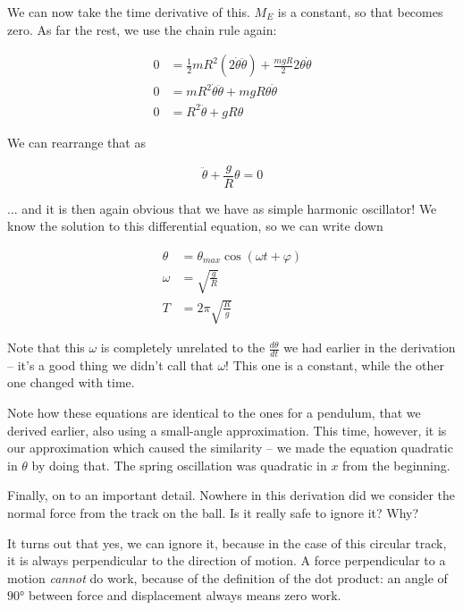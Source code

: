 \documentclass[8.01x]{subfiles}
\begin{document}
We can now take the time derivative of this. $M_E$ is a constant, so that becomes zero. As far the rest, we use the chain rule again:

\begin{align}
0 &= \frac{1}{2} m R^2 (2 \dot{\theta} \ddot{\theta}) + \frac{m g R}{2} 2 \theta \dot{\theta}\\
0 &= m R^2 \dot{\theta} \ddot{\theta} + m g R \theta \dot{\theta}\\
0 &= R^2 \ddot{\theta} + g R \theta
\end{align}

We can rearrange that as

\begin{equation}
\ddot{\theta} + \frac{g}{R} \theta = 0
\end{equation}

... and it is then again obvious that we have as simple harmonic oscillator! We know the solution to this differential equation, so we can write down

\begin{align}
\theta &= \theta_{max} \cos (\omega t + \varphi)\\
\omega &= \sqrt{\frac{g}{R}}\\
T      &= 2 \pi \sqrt{\frac{R}{g}}
\end{align}

Note that this $\omega$ is completely unrelated to the $\displaystyle \frac{d\theta}{dt}$ we had earlier in the derivation -- it's a good thing we didn't call that $\omega$! This one is a constant, while the other one changed with time.

Note how these equations are identical to the ones for a pendulum, that we derived earlier, also using a small-angle approximation. This time, however, it is our approximation which caused the similarity -- we made the equation quadratic in $\theta$ by doing that. The spring oscillation was quadratic in $x$ from the beginning.

Finally, on to an important detail. Nowhere in this derivation did we consider the normal force from the track on the ball. Is it really safe to ignore it? Why?

It turns out that yes, we can ignore it, because in the case of this circular track, it is always perpendicular to the direction of motion. A force perpendicular to a motion \emph{cannot} do work, because of the definition of the dot product: an angle of $\ang{90}$ between force and displacement always means zero work.
\end{document}
